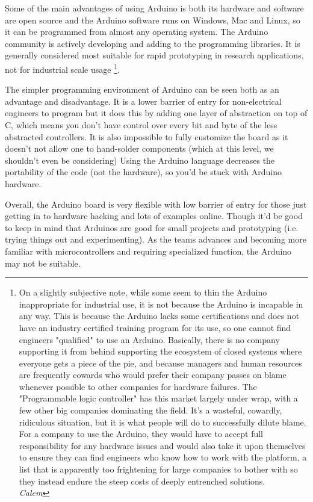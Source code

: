 		Some of the main advantages of using Arduino is both its hardware and software are open source and the Arduino software runs on Windows, Mac and Linux, so it can be programmed from almost any operating system.
		The Arduino community is actively developing and adding to the programming libraries. 	
		It is generally considered most suitable for rapid prototyping in research applications, not for industrial scale usage \footnote{On a slightly subjective note, while some seem to thin the Arduino inappropriate for industrial use, it is not because the Arduino is incapable in any way.  This is because the Arduino lacks some certifications and does not have an industry certified training program for its use, so one cannot find engineers "qualified" to use an Arduino.  Basically, there is no company supporting it from behind supporting the ecosystem of closed systems where everyone gets a piece of the pie, and because managers and human resources are frequently cowards who would prefer their company passes on blame whenever possible to other companies for hardware failures.  The "Programmable logic controller" has this market largely under wrap, with a few other big companies dominating the field.  It's a wasteful, cowardly, ridiculous situation, but it is what people will do to successfully dilute blame.  For a company to use the Arduino, they would have to accept full responsibility for any hardware issues and would also take it upon themselves to ensure they can find engineers who know how to work with the platform, a list that is apparently too frightening for large companies to bother with so they instead endure the steep costs of deeply entrenched solutions. \\ \emph{Calem}}.
		
		The simpler programming environment of Arduino can be seen both as an advantage and disadvantage.  
		It is a lower barrier of entry for non-electrical engineers to program but it does this by adding one layer of abstraction on top of C, which means you don't have control over every bit and byte of the less abstracted controllers.
		It is also impossible to fully customize the board as it doesn't not allow one to hand-solder components (which at this level, we shouldn't even be considering)
		Using the Arduino language decreases the portability of the code (not the hardware), so you'd be stuck with Arduino hardware.
		
		Overall, the Arduino board is very flexible with low barrier of entry for those just getting in to hardware hacking and lots of examples online.  Though it'd be good to keep in mind that Arduinos are good for small projects and prototyping (i.e. trying things out and experimenting).  As the teams advances and becoming more familiar with microcontrollers and requiring specialized function, the Arduino may not be suitable.

